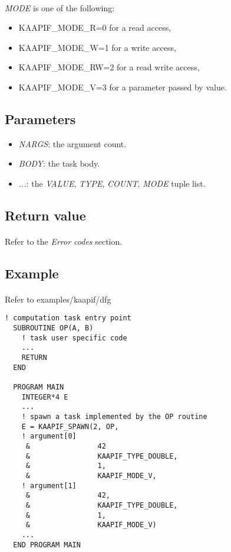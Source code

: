 \documentclass[a4paper, 11pt]{article}
\begin{document}
\paragraph{}
\textit{MODE} is one of the following:
\begin{itemize}
\item KAAPIF\_MODE\_R=0 for a read access,
\item KAAPIF\_MODE\_W=1 for a write access,
\item KAAPIF\_MODE\_RW=2 for a read write access,
\item KAAPIF\_MODE\_V=3 for a parameter passed by value.
\end{itemize}

\subsection{Parameters}
\begin{itemize}
\item \textit{NARGS}: the argument count.
\item \textit{BODY}: the task body.
\item \textit{...}: the \textit{VALUE}, \textit{TYPE}, \textit{COUNT}, \textit{MODE} tuple list.
\end{itemize}

\subsection{Return value}
\paragraph{}
Refer to the \textit{Error codes} section.

\subsection{Example}
\paragraph{}
Refer to examples/kaapif/dfg

\begin{small}
\begin{lstlisting}[frame=tb]
  ! computation task entry point
  SUBROUTINE OP(A, B)
    ! task user specific code
    ...
    RETURN
  END

  PROGRAM MAIN
    INTEGER*4 E
    ...
    ! spawn a task implemented by the OP routine
    E = KAAPIF_SPAWN(2, OP,
    ! argument[0]
     &                42
     &                KAAPIF_TYPE_DOUBLE,
     &                1,
     &                KAAPIF_MODE_V,
    ! argument[1]
     &                42,
     &                KAAPIF_TYPE_DOUBLE,
     &                1,
     &                KAAPIF_MODE_V)
    ...
  END PROGRAM MAIN
\end{lstlisting}
\end{small}
\end{document}
